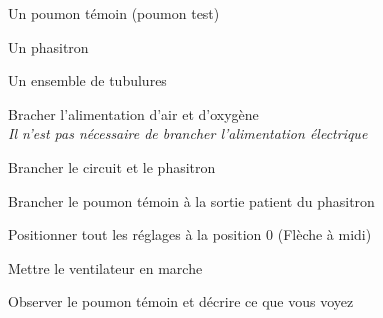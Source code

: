 \begin{exercice}
	\begin{materiel}
		\item Un poumon témoin (poumon test)
		\item Un phasitron
		\item Un ensemble de tubulures 
	\end{materiel}

	\begin{procedure}
	\item Bracher l'alimentation d'air et d'oxygène\\
		{\em \small Il n'est pas nécessaire de brancher l'alimentation électrique}
	\item Brancher le circuit et le phasitron
	\item Brancher le poumon témoin à la sortie patient du phasitron
	\item Positionner tout les réglages à la position 0 (Flèche à midi)
	\item Mettre le ventilateur en marche
	\item Observer le poumon témoin et décrire ce que vous voyez
	\end{procedure}
\end{exercice}
